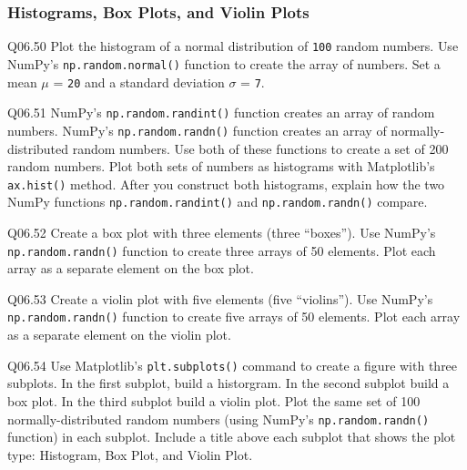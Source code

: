 \documentclass{book}
\newcommand{\passthrough}[1]{#1}
\begin{document}
    




    
        \hypertarget{histograms-box-plots-and-violin-plots}{%
\subsubsection{Histograms, Box Plots, and Violin
Plots}\label{histograms-box-plots-and-violin-plots}}

Q06.50 Plot the histogram of a normal distribution of
\passthrough{\lstinline!100!} random numbers. Use NumPy's
\passthrough{\lstinline!np.random.normal()!} function to create the
array of numbers. Set a mean \(\mu\) = \passthrough{\lstinline!20!} and
a standard deviation \(\sigma\) = \passthrough{\lstinline!7!}.

Q06.51 NumPy's \passthrough{\lstinline!np.random.randint()!} function
creates an array of random numbers. NumPy's
\passthrough{\lstinline!np.random.randn()!} function creates an array of
normally-distributed random numbers. Use both of these functions to
create a set of 200 random numbers. Plot both sets of numbers as
histograms with Matplotlib's \passthrough{\lstinline!ax.hist()!} method.
After you construct both histograms, explain how the two NumPy functions
\passthrough{\lstinline!np.random.randint()!} and
\passthrough{\lstinline!np.random.randn()!} compare.

Q06.52 Create a box plot with three elements (three ``boxes''). Use
NumPy's \passthrough{\lstinline!np.random.randn()!} function to create
three arrays of 50 elements. Plot each array as a separate element on
the box plot.

Q06.53 Create a violin plot with five elements (five ``violins''). Use
NumPy's \passthrough{\lstinline!np.random.randn()!} function to create
five arrays of 50 elements. Plot each array as a separate element on the
violin plot.

Q06.54 Use Matplotlib's \passthrough{\lstinline!plt.subplots()!} command
to create a figure with three subplots. In the first subplot, build a
historgram. In the second subplot build a box plot. In the third subplot
build a violin plot. Plot the same set of 100 normally-distributed
random numbers (using NumPy's
\passthrough{\lstinline!np.random.randn()!} function) in each subplot.
Include a title above each subplot that shows the plot type: Histogram,
Box Plot, and Violin Plot.
    
\end{document}
